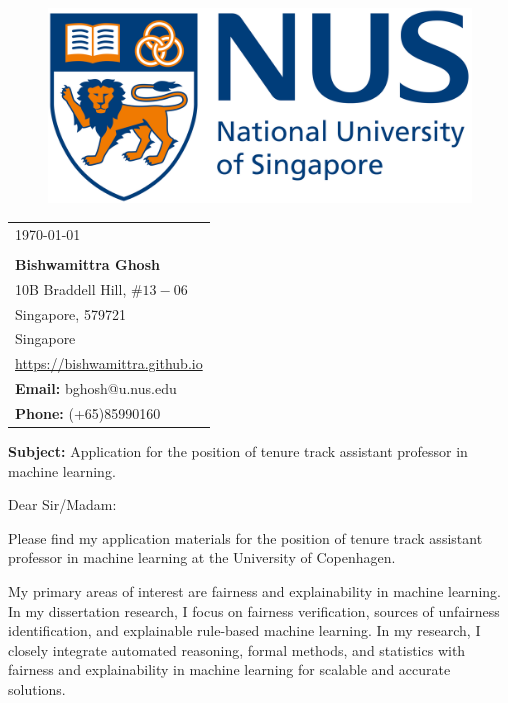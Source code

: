 \documentclass[a4paper,10pt]{article}
\newcommand{\blue}[1]{\textcolor{blue}{#1}}
\begin{document}
	
	
	
	\begin{figure}[t]
		\includegraphics[scale=0.03]{logo}
	\end{figure}
	\noindent\makebox[\linewidth]{\rule{\textwidth}{1pt}}
	
	
	\begin{flushright}
		\begin{tabular}{l@{}}
			\today \\
			\newline \\
			\textbf{Bishwamittra Ghosh}\\
			10B Braddell Hill, $ \#13-06 $\\ 
			Singapore, 579721\\
			Singapore\\
			\blue{\url{https://bishwamittra.github.io}}\\
			\textbf{Email:} bghosh@u.nus.edu\\
			\textbf{Phone:} (+65)85990160\\
		\end{tabular}%
	\end{flushright}


	\textbf{Subject:} Application for the position of tenure track assistant professor in machine learning. 
	
	
	
	\vspace{1em}
	Dear Sir/Madam:
	
	
	
	\vspace{1em}
	Please find my application materials for the position of tenure track assistant professor in machine learning at the University of Copenhagen.
	
	\vspace{1em}
	My primary areas of interest are  fairness and explainability in machine learning. In my dissertation research, I focus on  fairness verification, sources of unfairness identification, and  explainable rule-based machine learning. In my research, I closely integrate automated reasoning, formal methods, and statistics with fairness and explainability in machine learning for scalable and accurate solutions.
	
\end{document}
